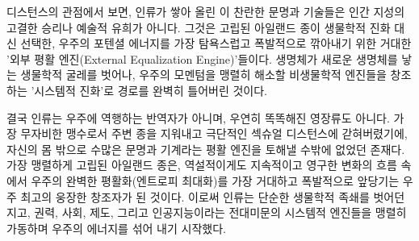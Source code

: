 디스턴스의 관점에서 보면, 인류가 쌓아 올린 이 찬란한 문명과 기술들은 인간 지성의 고결한 승리나 예술적 유희가 아니다. 그것은 고립된 아일랜드 종이 생물학적 진화 대신 선택한, 우주의 포텐셜 에너지를 가장 탐욕스럽고 폭발적으로 깎아내기 위한 거대한 '외부 평활 엔진(External Equalization Engine)'들이다. 생명체가 새로운 생명체를 낳는 생물학적 굴레를 벗어나, 우주의 모멘텀을 맹렬히 해소할 비생물학적 엔진들을 창조하는 '시스템적 진화'로 경로를 완벽히 틀어버린 것이다.

결국 인류는 우주에 역행하는 반역자가 아니며, 우연히 똑똑해진 영장류도 아니다. 가장 무자비한 맹수로서 주변 종을 지워내고 극단적인 섹슈얼 디스턴스에 갇혀버렸기에, 자신의 몸 밖으로 수많은 문명과 기계라는 평활 엔진을 토해낼 수밖에 없었던 존재다. 가장 맹렬하게 고립된 아일랜드 종은, 역설적이게도 지속적이고 영구한 변화의 흐름 속에서 우주의 완벽한 평활화(엔트로피 최대화)를 가장 거대하고 폭발적으로 앞당기는 우주 최고의 웅장한 창조자가 된 것이다.
이로써 인류는 단순한 생물학적 족쇄를 벗어던지고, 권력, 사회, 제도, 그리고 인공지능이라는 전대미문의 시스템적 엔진들을 맹렬히 가동하며 우주의 에너지를 섞어 내기 시작했다.
